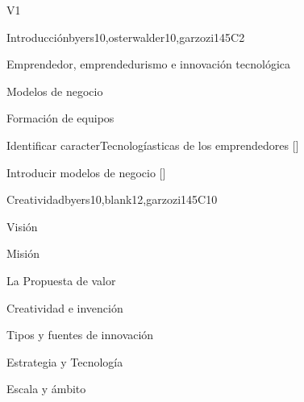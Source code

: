 \begin{syllabus}
\begin{competences}{V1}
   \end{competences}
   
   
   
   \begin{unit}{}{Introducción}{byers10,osterwalder10,garzozi14}{5}{C2}
   \begin{topics}
         \item Emprendedor, emprendedurismo e innovación tecnológica
         \item Modelos de negocio
         \item Formación de equipos
      \end{topics}
   
       \begin{learningoutcomes} 
         \item Identificar caracterTecnologíasticas de los emprendedores  [\Familiarity]
         \item Introducir modelos de negocio  [\Familiarity]
       \end{learningoutcomes} 
   \end{unit}
   
   \begin{unit}{}{Creatividad}{byers10,blank12,garzozi14}{5}{C10}
   \begin{topics}
         \item Visión
         \item Misión
         \item La Propuesta de valor
         \item Creatividad e invención
         \item Tipos y fuentes de innovación
         \item Estrategia y Tecnología
         \item Escala y ámbito
      \end{topics}
   

\end{unit}
\end{syllabus}
